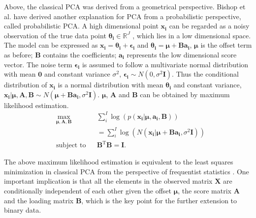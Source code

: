 Above, the classical PCA was derived from a geometrical perspective. Bishop et al.\cite{tipping1999probabilistic} have derived another explanation for PCA from a probabilistic perspective, called probabilistic PCA. A high dimensional point $\mathbf{x_i}$ can be regarded as a noisy observation of the true data point $\bm{\theta_i} \in \mathbb{R}^J$ , which lies in a low dimensional space. The model can be expressed as $\mathbf{x_i} = \bm{\theta_i} + \bm{\epsilon_i}$ and $\bm{\theta_i} = \bm{\mu} + \mathbf{Ba_i}$, $\bm{\mu}$ is the offset term as before; $\mathbf{B}$ contains the coefficients; $\mathbf{a_{i}}$ represents the low dimensional score vector. The noise term $\bm{\epsilon_{i}}$ is assumed to follow a multivariate normal distribution with mean $\mathbf{0}$ and constant variance $\sigma^2$, $\bm{\epsilon_i} \sim N(0,\sigma^2\mathbf{I})$. Thus the conditional distribution of $\mathbf{x_{i}}$ is a normal distribution with mean $\bm{\theta_i}$ and constant variance, $\mathbf{x_i}|\bm{\mu},\mathbf{A},\mathbf{B} \sim N(\bm{\mu} + \mathbf{Ba_i},\sigma^2\mathbf{I})$. $\bm{\mu}$, $\mathbf{A}$ and $\mathbf{B}$ can be obtained by maximum likelihood estimation.
\begin{equation}\label{chapter2_eq:3}
\begin{aligned}
&\underset{\bm{\mu},\mathbf{A},\mathbf{B}}{\text{max}}
&& \sum_i^I{\log(p(\mathbf{x_i}|\bm{\mu},\mathbf{a_i},\mathbf{B}))}\\
&
&&=\sum_i^I{\log(N(\mathbf{x_i}|\bm{\mu} + \mathbf{Ba_i},\sigma^2\mathbf{I}))}\\
&\text{subject to}
&&\mathbf{B}^{\text{T}}\mathbf{B} = \mathbf{I}.
\end{aligned}
\end{equation}

The above maximum likelihood estimation is equivalent to the least squares minimization in classical PCA from the perspective of frequentist statistics \cite{collins2001generalization}. One important implication is that all the elements in the observed matrix $\mathbf{X}$ are conditionally independent of each other given the offset $\bm{\mu}$, the score matrix $\mathbf{A}$ and the loading matrix $\mathbf{B}$, which is the key point for the further extension to binary data.

